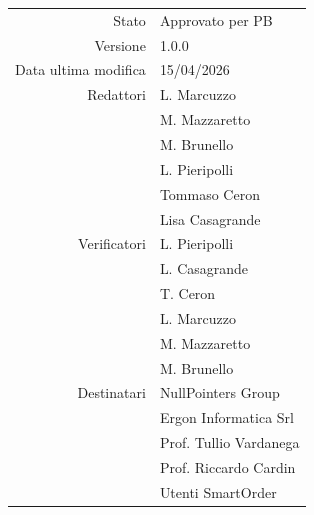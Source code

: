 \begin{center}
\begin{tabular}{r|l}
    Stato & Approvato per PB \\[0.5em]
    Versione & 1.0.0 \\[0.5em]
    Data ultima modifica & 15/04/2026 \\[0.5em]
    Redattori & L. Marcuzzo \\
              & M. Mazzaretto \\
              & M. Brunello \\ 
              & L. Pieripolli \\ 
              & Tommaso Ceron \\
              & Lisa Casagrande \\ [0.5em]
    Verificatori & L. Pieripolli \\
                 & L. Casagrande \\
                 & T. Ceron \\
                 & L. Marcuzzo \\
                 & M. Mazzaretto \\
                 & M. Brunello \\ [0.5em]
    Destinatari & NullPointers Group \\
                & Ergon Informatica Srl \\
                & Prof. Tullio Vardanega \\
                & Prof. Riccardo Cardin \\
                & Utenti SmartOrder \\
\end{tabular}
\end{center}
